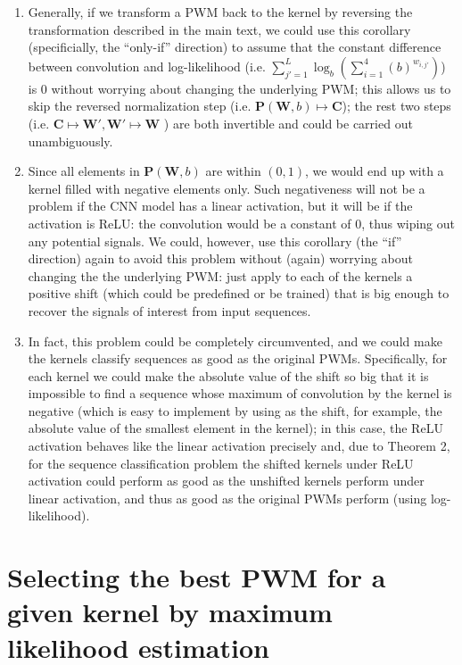 \documentclass[12pt]{article}
\newcommand{\matrixSymbol}[1]{\mathbf{#1}}
\begin{document}
\begin{enumerate}
\item Generally, if we transform a PWM back to the kernel by reversing the transformation described in the main text, we could use this corollary (specificially, the ``only-if'' direction) to assume that the constant difference between convolution and log-likelihood (i.e. $\sum_{j'=1}^{L}{\log_{b} \left( \sum_{i=1}^{4}{(b)^{w_{i, j'}} }\right) }$) is 0 without worrying about changing the underlying PWM; this allows us to skip the reversed normalization step (i.e. $\matrixSymbol{P}(\matrixSymbol{W}, b) \mapsto \matrixSymbol{C}$); the rest two steps (i.e. $\matrixSymbol{C} \mapsto \matrixSymbol{W}', \matrixSymbol{W}' \mapsto \matrixSymbol{W}$ ) are both invertible and could be carried out unambiguously. 
\item Since all elements in $\matrixSymbol{P}(\matrixSymbol{W}, b)$ are within $(0, 1)$, we would end up with a kernel filled with negative elements only. Such negativeness will not be a problem if the CNN model has a linear activation, but it will be if the activation is ReLU: the convolution would be a constant of 0, thus wiping out any potential signals. We could, however, use this corollary (the ``if'' direction) again to avoid this problem without (again) worrying about changing the the underlying PWM: just apply to each of the kernels a positive shift (which could be predefined or be trained) that is big enough to recover the signals of interest from input sequences.
\item In fact, this problem could be completely circumvented, and we could make the kernels classify sequences as good as the original PWMs. Specifically, for each kernel we could make the absolute value of the shift so big that it is impossible to find a sequence whose maximum of convolution by the kernel is negative (which is easy to implement by using as the shift, for example, the absolute value of the smallest element in the kernel); in this case, the ReLU activation behaves like the linear activation precisely and, due to Theorem 2, for the sequence classification problem the shifted kernels under ReLU activation could perform as good as the unshifted kernels perform under linear activation, and thus as good as the original PWMs perform (using log-likelihood).
\end{enumerate}


\section{Selecting  the best PWM for a given kernel by maximum likelihood estimation}
\end{document}
